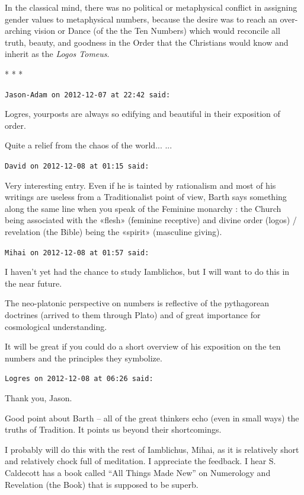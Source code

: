 In the classical mind, there was no political or metaphysical conflict in assigning gender values to metaphysical numbers, because the desire was to reach an over-arching vision or Dance (of the the Ten Numbers) which would reconcile all truth, beauty, and goodness in the Order that the Christians would know and inherit as the \emph{Logos Tomeus}.



\begin{center}* * *\end{center}

\begin{footnotesize}
\begin{sffamily}
\texttt{Jason-Adam on 2012-12-07 at 22:42 said:}

Logres, yourposts are always so edifying and beautiful in their exposition of order.

Quite a relief from the chaos of the world... ... 

\hfill

\texttt{David on 2012-12-08 at 01:15 said:}

Very interesting entry. Even if he is tainted by rationalism and most of his writings are useless from a Traditionalist point of view, Barth says something along the same line when you speak of the Feminine monarchy : the Church being associated with the «flesh» (feminine receptive) and divine order (logos) / revelation (the Bible) being the «spirit» (masculine giving).

\hfill

\texttt{Mihai on 2012-12-08 at 01:57 said:}

I haven't yet had the chance to study Iamblichos, but I will want to do this in the near future.

The neo-platonic perspective on numbers is reflective of the pythagorean doctrines (arrived to them through Plato) and of great importance for cosmological understanding.

It will be great if you could do a short overview of his exposition on the ten numbers and the principles they symbolize.

\hfill

\texttt{Logres on 2012-12-08 at 06:26 said:}

Thank you, Jason.

Good point about Barth -- all of the great thinkers echo (even in small ways) the truths of Tradition. It points us beyond their shortcomings.

I probably will do this with the rest of Iamblichus, Mihai, as it is relatively short and relatively chock full of meditation. I appreciate the feedback. I hear S. Caldecott has a book called ``All Things Made New'' on Numerology and Revelation (the Book) that is supposed to be superb.


\hfill

\end{sffamily}
\end{footnotesize}

